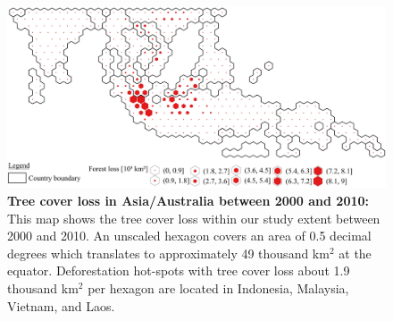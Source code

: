			\begin{figure}[ht]
				\centering
				\includegraphics[scale=1.]{img/asia_loss_frameless}
				\caption[Tree cover loss in Asia/Australia between 2000 and 2010]{\textbf{Tree cover loss in Asia/Australia between 2000 and 2010:} This map shows the tree cover loss within our study extent between 2000 and 2010. An unscaled hexagon covers an area of 0.5 decimal degrees which translates to approximately 49 thousand km$^2$ at the equator. Deforestation hot-spots with tree cover loss about 1.9 thousand km$^2$ per hexagon are located in Indonesia, Malaysia, Vietnam, and Laos.}
				\label{fig:asia_loss}
			\end{figure}

